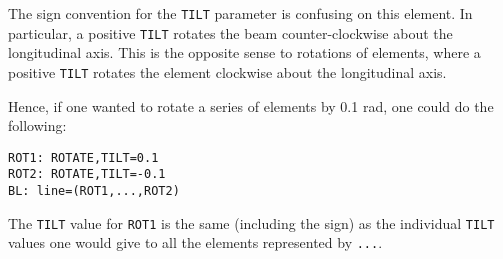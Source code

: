 The sign convention for the {\tt TILT}  parameter is confusing on this element.
In particular, a positive {\tt TILT} rotates the beam counter-clockwise about the
longitudinal axis.  This is the opposite sense to rotations of elements, where a 
positive {\tt TILT} rotates the element clockwise about the longitudinal axis.

Hence, if one wanted to rotate a series of elements by 0.1 rad, one could do the
following:
\begin{verbatim}
ROT1: ROTATE,TILT=0.1
ROT2: ROTATE,TILT=-0.1
BL: line=(ROT1,...,ROT2)
\end{verbatim}
The {\tt TILT} value for {\tt ROT1} is the same (including the sign) as the individual
{\tt TILT} values one would give to all the elements represented by \verb|...|.

